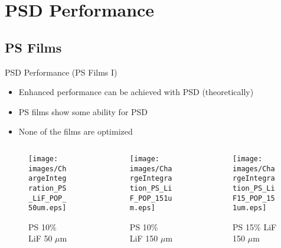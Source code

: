 
% 
%
\section{PSD Performance}

\subsection{PS Films}
\begin{frame}{PSD Performance (PS Films I)}
\small
\begin{itemize}
	\item Enhanced performance can be achieved with PSD (theoretically)
	\item PS films show some ability for PSD
	\item None of the films are optimized \cite{zaitseva_plastic_2012}
\end{itemize}
\begin{columns}[onlytextwidth]
\begin{column}{0.30\textwidth}
	\tiny
	\begin{figure}
		\centering
		\texttt{[image: images/ChargeIntegration\_PS\_LiF\_POP\_50um.eps]}
		\caption{PS 10\% LiF 50 $\mu$m}
	\end{figure}
\end{column}
\begin{column}{0.30\textwidth}
	\tiny
	\begin{figure}
		\centering
		\texttt{[image: images/ChargeIntegration\_PS\_LiF\_POP\_151um.eps]}
		\caption{PS 10\% LiF 150 $\mu$m}
	\end{figure}
\end{column}
\begin{column}{0.30\textwidth}
	\tiny
	\begin{figure}
		\centering
		\texttt{[image: images/ChargeIntegration\_PS\_LiF15\_POP\_151um.eps]}
		\caption{PS 15\% LiF 150 $\mu$m}
	\end{figure}
\end{column}
\end{columns}
\end{frame}
